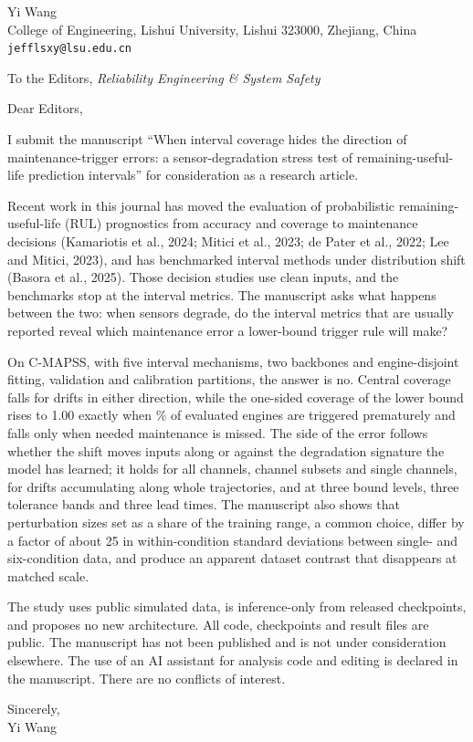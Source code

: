 \documentclass[11pt,a4paper]{article}
\begin{document}
\onehalfspacing
\noindent Yi Wang\\
College of Engineering, Lishui University, Lishui 323000, Zhejiang, China\\
\texttt{jefflsxy@lsu.edu.cn}

\bigskip
\noindent To the Editors, \emph{Reliability Engineering \& System Safety}

\bigskip
\noindent Dear Editors,

\medskip
\noindent I submit the manuscript ``When interval coverage hides the direction of maintenance-trigger errors: a sensor-degradation stress test of remaining-useful-life prediction intervals'' for consideration as a research article.

Recent work in this journal has moved the evaluation of probabilistic remaining-useful-life (RUL) prognostics from accuracy and coverage to maintenance decisions (Kamariotis et al., 2024; Mitici et al., 2023; de Pater et al., 2022; Lee and Mitici, 2023), and has benchmarked interval methods under distribution shift (Basora et al., 2025). Those decision studies use clean inputs, and the benchmarks stop at the interval metrics. The manuscript asks what happens between the two: when sensors degrade, do the interval metrics that are usually reported reveal which maintenance error a lower-bound trigger rule will make?

On C-MAPSS, with five interval mechanisms, two backbones and engine-disjoint fitting, validation and calibration partitions, the answer is no. Central coverage falls for drifts in either direction, while the one-sided coverage of the lower bound rises to 1.00 exactly when \RVPremTwo{}\% of evaluated engines are triggered prematurely and falls only when needed maintenance is missed. The side of the error follows whether the shift moves inputs along or against the degradation signature the model has learned; it holds for all channels, channel subsets and single channels, for drifts accumulating along whole trajectories, and at three bound levels, three tolerance bands and three lead times. The manuscript also shows that perturbation sizes set as a share of the training range, a common choice, differ by a factor of about 25 in within-condition standard deviations between single- and six-condition data, and produce an apparent dataset contrast that disappears at matched scale.

The study uses public simulated data, is inference-only from released checkpoints, and proposes no new architecture. All code, checkpoints and result files are public. The manuscript has not been published and is not under consideration elsewhere. The use of an AI assistant for analysis code and editing is declared in the manuscript. There are no conflicts of interest.

\medskip
\noindent Sincerely,\\
Yi Wang
\end{document}
